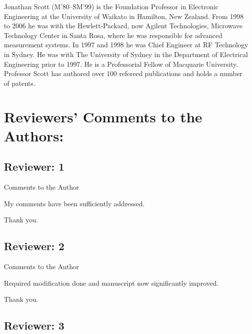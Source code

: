 \documentclass[journal, a4paper]{IEEEtran}
\begin{document}
\begin{IEEEbiography}{Jonathan Scott}
(M'80--SM'99) is the Foundation Professor in
Electronic Engineering at the University of Waikato in Hamilton, New
Zealand.  From 1998 to 2006 he was with the Hewlett-Packard,
now Agilent Technologies, Microwave Technology Center in Santa Rosa,
where he was responsible for advanced measurement systems.  In 1997 and
1998 he was Chief Engineer at RF Technology in Sydney.  He was with The
University of Sydney in the Department of Electrical Engineering prior
to 1997.  He is a Professorial Fellow of Macquarie
University.  Professor Scott has authored over 100 refereed
publications and holds a number of patents.
\end{IEEEbiography}



\section*{Reviewers' Comments to the Authors:}

\subsection*{Reviewer: 1}

Comments to the Author

{
    \color{OliveGreen}
    My comments have been sufficiently addressed.
}

{
    \color{blue}
    Thank you.
}


\subsection*{Reviewer: 2}

Comments to the Author

{
    \color{OliveGreen}
    Required modification done and manuscript now significantly improved.
}

{
    \color{blue}
    Thank you.
}

\subsection*{Reviewer: 3}
\end{document}
